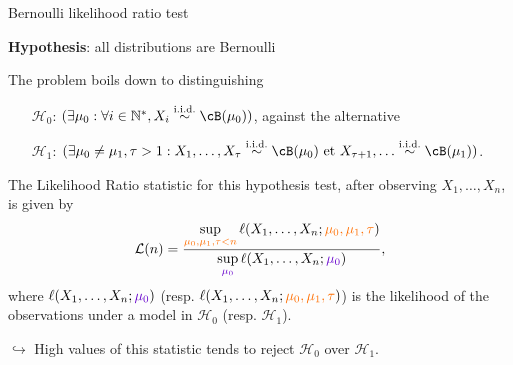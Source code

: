 \documentclass[11pt,english,ignorenonframetext,]{beamer}
\begin{document}
\begin{frame}{Bernoulli likelihood ratio test}

  \textbf{Hypothesis}: all distributions are Bernoulli

  The problem boils down to distinguishing
  \begin{itemize}
    \item[\textcolor{deeppurple}{$\mathcal{H}_0$}:]
    \textcolor{deeppurple}{$(\exists \mu_0 : \forall i\in\mathbb{N}^*, X_i \overset{\text{i.i.d.}}{\sim} \cB(\mu_0))$},
    against the alternative
    \item[\textcolor{meca}{$\mathcal{H}_1$}:]
    \textcolor{meca}{$(\exists \mu_0 \neq \mu_1, \tau > 1 : X_1, \ldots, X_\tau \overset{\text{i.i.d.}}{\sim} \cB(\mu_0) \text{~et~} X_{\tau+1}, \ldots \overset{\text{i.i.d.}}{\sim} \cB(\mu_1))$}.
  \end{itemize}

  \pause

  The \alert{Likelihood Ratio statistic} for this hypothesis test, after observing $X_1,\dots,X_n$, is given by
  \[ \mathcal{L}(n) = \frac{\sup\limits_{\textcolor{meca}{\mu_0,\mu_1,\tau < n}}\ell(X_1,\dots,X_n ; \textcolor{meca}{\mu_0,\mu_1,\tau})}{\sup\limits_{\textcolor{deeppurple}{\mu_0}}\ell(X_1,\dots,X_n ;\textcolor{deeppurple}{\mu_0})},\]
  where $\ell(X_1,\dots,X_n ; \textcolor{deeppurple}{\mu_0})$ (resp. $\ell(X_1,\dots,X_n ; \textcolor{meca}{\mu_0,\mu_1,\tau})$) is the likelihood of the observations under a model in \textcolor{deeppurple}{$\mathcal{H}_0$} (resp. \textcolor{meca}{$\mathcal{H}_1$}).

  \pause

  \alert{$\hookrightarrow$ High values of this statistic tends to reject \textcolor{deeppurple}{$\mathcal{H}_0$} over \textcolor{meca}{$\mathcal{H}_1$}.}

\end{frame}
\end{document}
